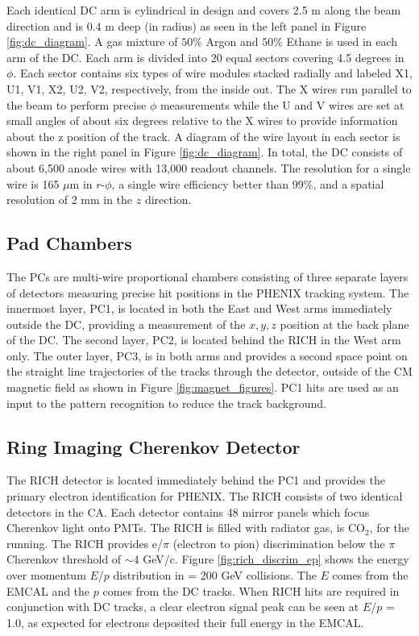 Each identical DC arm is cylindrical in design and covers 2.5 m along the beam direction and is 0.4 m deep (in radius) as seen in the left panel in Figure \ref{fig:dc_diagram}. A gas mixture of $50\%$ Argon and $50\%$ Ethane is used in each arm of the DC. Each arm is divided into 20 equal sectors covering 4.5 degrees in $\phi$. Each sector contains six types of wire modules stacked radially and labeled X1, U1, V1, X2, U2, V2, respectively, from the inside out. The X wires run parallel to the beam to perform precise $\phi$ measurements while the U and V wires are set at small angles of about six degrees relative to the X wires to provide information about the z position of the track. A diagram of the wire layout in each sector is shown in the right panel in Figure \ref{fig:dc_diagram}. In total, the DC consists of about 6,500 anode wires with 13,000 readout channels. The  resolution for a single wire is 165 $\mu$m in $r$-$\phi$, a single wire efficiency better than 99\%, and a spatial resolution of  2 mm in the $z$ direction.

\subsection{Pad Chambers}
The PCs are multi-wire proportional chambers consisting of three separate layers of detectors measuring precise hit positions in the PHENIX tracking system. The innermost layer, PC1, is located in both the East and West arms immediately outside the DC, providing a measurement of the $x, y, z$ position at the back plane of the DC. The second layer, PC2, is located behind the RICH in the West arm only. The outer layer, PC3, is in both arms and provides a second space point on the straight line trajectories of the tracks through the detector, outside of the CM magnetic field as shown in Figure \ref{fig:magnet_figures}. PC1 hits are used as an input to the pattern recognition to reduce the track background.

\subsection{Ring Imaging Cherenkov Detector}
The RICH detector is located immediately behind the PC1 and provides the primary electron identification for PHENIX. The RICH consists of two identical detectors in the CA. Each detector contains 48 mirror panels which focus Cherenkov light onto PMTs. The RICH is filled with radiator gas, is CO$_2$, for the \pau running. The RICH provides e/$\pi$ (electron to pion) discrimination below the $\pi$ Cherenkov threshold of $\sim$4 GeV/c. Figure \ref{fig:rich_discrim_ep} shows the energy over momentum $E$/$p$ distribution in \auau \sqsn = 200 GeV collisions. The $E$ comes from the EMCAL and the $p$ comes from the DC tracks. When RICH hits are required in conjunction with DC tracks, a clear electron signal peak can be seen at $E$/$p$ = 1.0, as expected for electrons deposited their full energy in the EMCAL.

